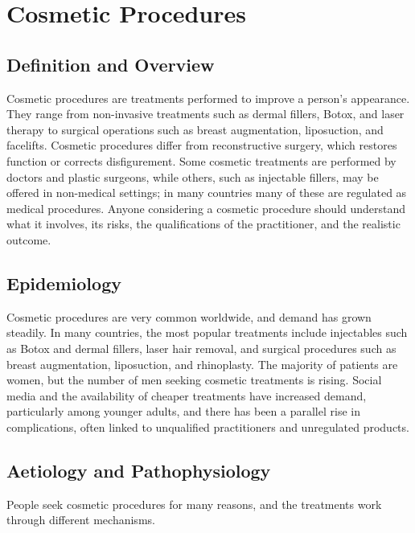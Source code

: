 \chapter{Cosmetic Procedures}

\section*{Definition and Overview}
Cosmetic procedures are treatments performed to improve a person's appearance. They range from non-invasive treatments such as dermal fillers, Botox, and laser therapy to surgical operations such as breast augmentation, liposuction, and facelifts. Cosmetic procedures differ from reconstructive surgery, which restores function or corrects disfigurement. Some cosmetic treatments are performed by doctors and plastic surgeons, while others, such as injectable fillers, may be offered in non-medical settings; in many countries many of these are regulated as medical procedures. Anyone considering a cosmetic procedure should understand what it involves, its risks, the qualifications of the practitioner, and the realistic outcome.

\section*{Epidemiology}
Cosmetic procedures are very common worldwide, and demand has grown steadily. In many countries, the most popular treatments include injectables such as Botox and dermal fillers, laser hair removal, and surgical procedures such as breast augmentation, liposuction, and rhinoplasty. The majority of patients are women, but the number of men seeking cosmetic treatments is rising. Social media and the availability of cheaper treatments have increased demand, particularly among younger adults, and there has been a parallel rise in complications, often linked to unqualified practitioners and unregulated products.

\section*{Aetiology and Pathophysiology}
People seek cosmetic procedures for many reasons, and the treatments work through different mechanisms.

